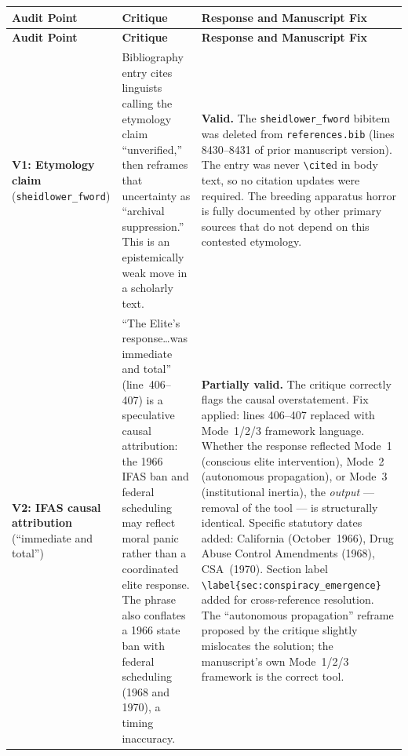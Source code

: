 \documentclass[12pt]{article}
\begin{document}
\begin{longtable}{@{}%
  >{\raggedright\arraybackslash}p{3.0cm}%
  >{\raggedright\arraybackslash}p{4.2cm}%
  >{\raggedright\arraybackslash}p{7.8cm}@{}}
\toprule
\textbf{Audit Point} &
\textbf{Critique} &
\textbf{Response and Manuscript Fix} \\
\midrule
\endfirsthead
\toprule
\textbf{Audit Point} &
\textbf{Critique} &
\textbf{Response and Manuscript Fix} \\
\midrule
\endhead
\midrule\multicolumn{3}{r}{\small\itshape continued\ldots}\endfoot
\bottomrule\endlastfoot

\textbf{V1: Etymology claim} \newline
(\texttt{sheidlower\_fword})
&
Bibliography entry cites linguists calling the etymology claim
``unverified,'' then reframes that uncertainty as ``archival
suppression.''  This is an epistemically weak move in a scholarly text.
&
\textbf{Valid.}  The \texttt{sheidlower\_fword} bibitem was deleted from
\texttt{references.bib} (lines 8430--8431 of prior manuscript version).
The entry was never \verb|\cite|d in body text, so no citation updates
were required.  The breeding apparatus horror is fully documented by
other primary sources that do not depend on this contested etymology. \\

\addlinespace

\textbf{V2: IFAS causal attribution} \newline
(``immediate and total'')
&
``The Elite's response\ldots was immediate and total'' (line~406--407)
is a speculative causal attribution: the 1966 IFAS ban and federal
scheduling may reflect moral panic rather than a coordinated
elite response.  The phrase also conflates a 1966 state ban with
federal scheduling (1968 and 1970), a timing inaccuracy.
&
\textbf{Partially valid.}  The critique correctly flags the causal
overstatement.  Fix applied: lines 406--407 replaced with Mode~1/2/3
framework language.  Whether the response reflected Mode~1 (conscious
elite intervention), Mode~2 (autonomous propagation), or Mode~3
(institutional inertia), the \emph{output} --- removal of the tool ---
is structurally identical.  Specific statutory dates added: California
(October~1966), Drug Abuse Control Amendments (1968), CSA~(1970).
Section label \verb|\label{sec:conspiracy_emergence}| added for
cross-reference resolution.  The ``autonomous propagation'' reframe
proposed by the critique slightly mislocates the solution; the
manuscript's own Mode~1/2/3 framework is the correct tool. \\


\end{longtable}
\end{document}
